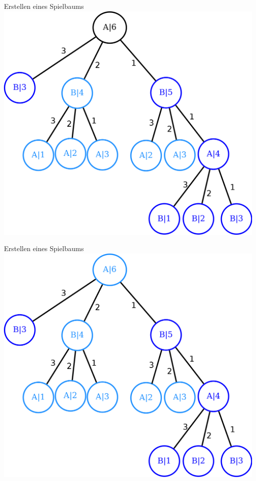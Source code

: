 \documentclass[18pt]{beamer}
\begin{document}
\begin{frame}{Erstellen eines Spielbaums}
\includegraphics[scale=0.4]{baum17.png}
\end{frame}

\begin{frame}{Erstellen eines Spielbaums}
\includegraphics[scale=0.4]{baum18.png}
\end{frame}
\end{document}
